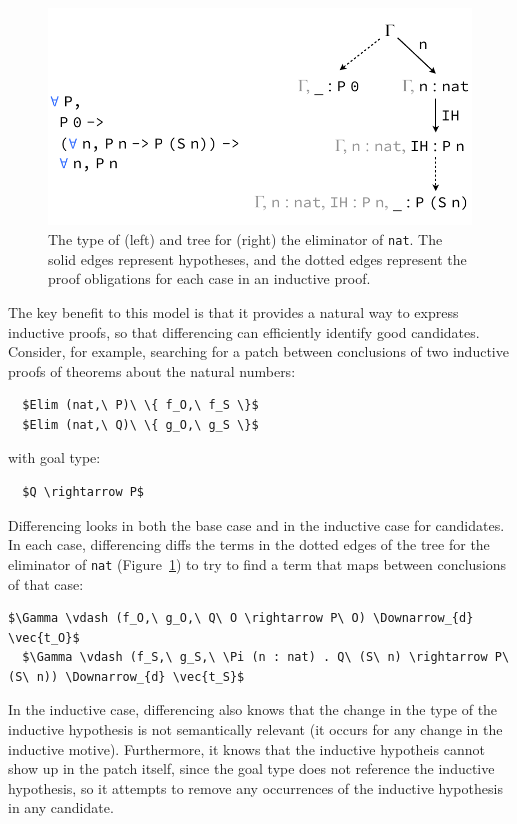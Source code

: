\begin{figure}[t]
\begin{center}
\includegraphics[scale=0.55]{repair/nat_ind}
\end{center}
\caption{The type of (left) and tree for (right) the eliminator of \lstinline{nat}. The solid edges represent hypotheses, and the dotted edges represent the proof obligations for each case in an inductive proof.} %
\label{fig:cattree}
\end{figure}

The key benefit to this model is that it provides a natural way to express inductive proofs, so
that differencing can efficiently identify good candidates.
Consider, for example, searching for a patch between conclusions of two inductive proofs of theorems about the natural numbers:

\begin{lstlisting}
  $Elim (nat,\ P)\ \{ f_O,\ f_S \}$
  $Elim (nat,\ Q)\ \{ g_O,\ g_S \}$ 
\end{lstlisting}
with goal type:

\begin{lstlisting}
  $Q \rightarrow P$
\end{lstlisting}

Differencing looks in both the base case and in the inductive case for candidates.
In each case, differencing diffs the terms in the dotted edges of the tree for the eliminator of \lstinline{nat} (Figure~\ref{fig:cattree}) to
try to find a term that maps between conclusions of that case:

\begin{lstlisting}[language=coq]
  $\Gamma \vdash (f_O,\ g_O,\ Q\ O \rightarrow P\ O) \Downarrow_{d} \vec{t_O}$
  $\Gamma \vdash (f_S,\ g_S,\ \Pi (n : nat) . Q\ (S\ n) \rightarrow P\ (S\ n)) \Downarrow_{d} \vec{t_S}$
\end{lstlisting}
In the inductive case, differencing also knows that the change in the type of the inductive hypothesis is not semantically relevant (it occurs for any change in the inductive motive).
Furthermore, it knows that the inductive hypotheis cannot show up in the patch itself, since the goal type does not reference the inductive hypothesis,
so it attempts to remove any occurrences of the inductive hypothesis in any candidate.

